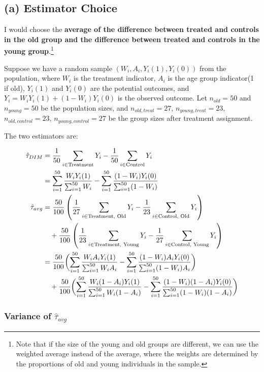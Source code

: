 \documentclass[11pt]{article}
\numberwithin{equation}{section}
\begin{document}
\subsection{(a) Estimator Choice}


I would choose the \textbf{average of the difference between treated and controls in the old group and the difference between treated and controls in the young group}.\footnote{Note that if the size of the young and old groups are different, we can use the weighted average instead of the average, where the weights are determined by the proportions of old and young individuals in the sample.}


Suppose we have a random sample $(W_i, A_i, Y_i(1), Y_i(0))$ from the population, where $W_i$ is the treatment indicator, $A_i$ is the age group indicator(1 if old), $Y_i(1)$ and $Y_i(0)$ are the potential outcomes, and $Y_i = W_iY_i(1) + (1-W_i)Y_i(0)$ is the observed outcome.
Let $n_{old} = 50$ and $n_{young} = 50$ be the population sizes, and $n_{old,treat} = 27$, $n_{young,treat} = 23$, $n_{old,control} = 23$, $n_{young,control} = 27$ be the group sizes after treatment assignment.

The two estimators are:

\begin{align}
\hat{\tau}_{DIM} &= \frac{1}{50} \sum_{i \in \text{Treatment}} Y_i - \frac{1}{50} \sum_{i \in \text{Control}} Y_i \\
&= \sum_{i=1}^{50}\frac{W_iY_i(1)}{\sum_{i=1}^{50}W_i} - \sum_{i=1}^{50}\frac{(1-W_i)Y_i(0)}{\sum_{i=1}^{50}(1-W_i)}\notag\\
\hat{\tau}_{avg} &= \frac{50}{100} \left(\frac{1}{27} \sum_{i \in \text{Treatment, Old}} Y_i - \frac{1}{23} \sum_{i \in \text{Control, Old}} Y_i\right) \\
&\quad + \frac{50}{100} \left(\frac{1}{23} \sum_{i \in \text{Treatment, Young}} Y_i - \frac{1}{27} \sum_{i \in \text{Control, Young}} Y_i\right)\notag\\
&= \frac{50}{100}\biggl(\sum_{i=1}^{50}\frac{W_iA_iY_i(1)}{\sum_{i=1}^{50}W_iA_i} - \sum_{i=1}^{50}\frac{(1-W_i)A_iY_i(0)}{\sum_{i=1}^{50}(1-W_i)A_i}\biggr)\notag\\
&\quad + \frac{50}{100}\biggl(\sum_{i=1}^{50}\frac{W_i(1-A_i)Y_i(1)}{\sum_{i=1}^{50}W_i(1-A_i)} - \sum_{i=1}^{50}\frac{(1-W_i)(1-A_i)Y_i(0)}{\sum_{i=1}^{50}(1-W_i)(1-A_i)}\biggr)\notag
\end{align}

\subsubsection{Variance of \texorpdfstring{$\hat{\tau}_{avg}$}{tau\_avg}}
\end{document}
